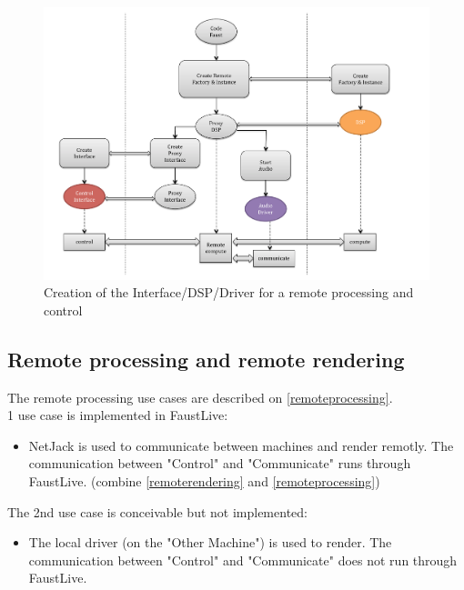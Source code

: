 \documentclass[a4paper]{article}
\begin{document}
\begin{figure}[!h]
\begin{center}
\includegraphics[width=\columnwidth]{images/CCC5}
\caption{Creation of the Interface/DSP/Driver for a remote processing and control}
\label{fig:CCC8}
\end{center}
\end{figure}


\newpage
\subsection{ Remote processing and remote rendering}

The remote processing use cases are described on {\ref {remoteprocessing}}. \\

1 use case is implemented in FaustLive:
\begin{itemize}
\item NetJack is used to communicate between machines and render remotly. The communication between "Control" and "Communicate" runs through FaustLive. (combine \ref{remoterendering} and \ref{remoteprocessing})
\end{itemize}

The 2nd use case is conceivable but not implemented:
\begin{itemize}
\item The local driver (on the "Other Machine") is used to render. The communication between "Control" and "Communicate" does not run through FaustLive.
\end{itemize}
\end{document}
